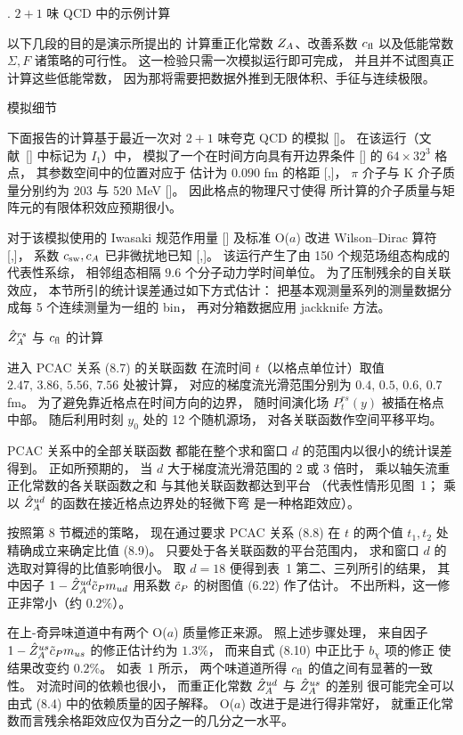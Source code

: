 
. $2+1$ 味 QCD 中的示例计算

以下几段的目的是演示所提出的
计算重正化常数 $Z_A$、改善系数 $c_{\rm fl}$
以及低能常数 $\Sigma,F$ 诸策略的可行性。
这一检验只需一次模拟运行即可完成，
并且并不试图真正计算这些低能常数，
因为那将需要把数据外推到无限体积、手征与连续极限。


 模拟细节

下面报告的计算基于最近一次对 $2+1$ 味夸克 QCD 的模拟
[\cite{TMopenQCD}]。
在该运行（文献~[\cite{TMopenQCD}] 中标记为 $I_1$）中，
模拟了一个在时间方向具有开边界条件 [\cite{openQCD}]
的 $64\times32^3$ 格点，
其参数空间中的位置对应于
估计为 $0.090$ fm 的格距
[\cite{AokiEtAlI},\cite{AokiEtAlII}]，
$\pi$ 介子与 K 介子质量分别约为 203 与 520 MeV
[\cite{TMopenQCD}]。
因此格点的物理尺寸使得
所计算的介子质量与矩阵元的有限体积效应预期很小。

对于该模拟使用的 Iwasaki 规范作用量 [\cite{Iwasaki}]
及标准 O($a$) 改进 Wilson--Dirac 算符
[\cite{SW},\cite{SFimp}]，
系数 $c_{\rm sw},c_A$ 已非微扰地已知
[\cite{AokiEtAlIII},\cite{KanekoEtAl}]。
该运行产生了由 150 个规范场组态构成的代表性系综，
相邻组态相隔 $9.6$ 个分子动力学时间单位。
为了压制残余的自关联效应，
本节所引的统计误差通过如下方式估计：
把基本观测量系列的测量数据分成每 5 个连续测量为一组的 bin，
再对分箱数据应用 jackknife 方法。



 $\hat{Z}_A^{rs}$ 与 $c_{\rm fl}$ 的计算

进入 PCAC 关系 (8.7) 的关联函数
在流时间 $t$（以格点单位计）取值
$2.47,\,3.86,\,5.56,\,7.56$ 处被计算，
对应的梯度流光滑范围分别为 $0.4,\,0.5,\,0.6,\,0.7$ fm。
为了避免靠近格点在时间方向的边界，
随时间演化场 $P_t^{rs}(y)$ 被插在格点中部。
随后利用时刻 $y_0$ 处的 12 个随机源场，
对各关联函数作空间平移平均。

PCAC 关系中的全部关联函数
都能在整个求和窗口 $d$ 的范围内以很小的统计误差得到。
正如所预期的，
当 $d$ 大于梯度流光滑范围的 2 或 3 倍时，
乘以轴矢流重正化常数的各关联函数之和
与其他关联函数都达到平台
（代表性情形见图~1；
乘以 $\hat{Z}_A^{ud}$ 的函数在接近格点边界处的轻微下弯
是一种格距效应）。

按照第 8 节概述的策略，
现在通过要求 PCAC 关系 (8.8)
在 $t$ 的两个值 $t_1,t_2$ 处精确成立来确定比值 (8.9)。
只要处于各关联函数的平台范围内，
求和窗口 $d$ 的选取对算得的比值影响很小。
取 $d=18$ 便得到表~1 第二、三列所引的结果，
其中因子 $1-\hat{Z}_A^{ud}\tilde{c}_P m_{ud}$
用系数 $\tilde{c}_P$ 的树图值 (6.22) 作了估计。
不出所料，这一修正非常小（约 $0.2\%$）。

在上-奇异味道道中有两个 O($a$) 质量修正来源。
照上述步骤处理，
来自因子 $1-\hat{Z}_A^{us}\tilde{c}_P m_{us}$ 的修正估计约为 $1.3\%$，
而来自式 (8.10) 中正比于 $b_{\chi}$ 项的修正
使结果改变约 $0.2\%$。
如表~1 所示，
两个味道道所得 $c_{\rm fl}$ 的值之间有显著的一致性。
对流时间的依赖也很小，
而重正化常数 $\hat{Z}_A^{ud}$ 与 $\hat{Z}_A^{us}$ 的差别
很可能完全可以由式 (8.4) 中的依赖质量的因子解释。
O($a$) 改进于是进行得非常好，
就重正化常数而言残余格距效应仅为百分之一的几分之一水平。


